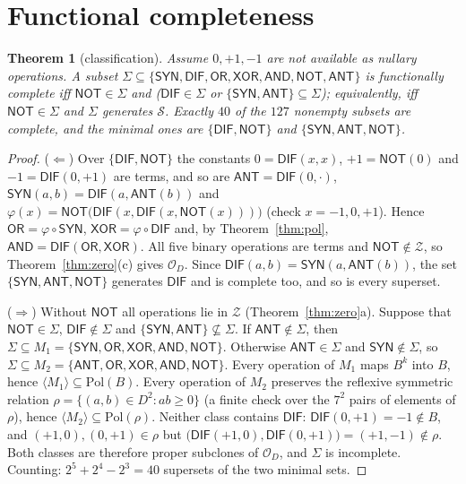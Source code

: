 \documentclass[conference]{IEEEtran}
\newcommand{\D}{D}
\newcommand{\fold}{\varphi}
\newcommand{\SYN}{\mathsf{SYN}}
\newcommand{\DIF}{\mathsf{DIF}}
\newcommand{\OR}{\mathsf{OR}}
\newcommand{\XOR}{\mathsf{XOR}}
\newcommand{\AND}{\mathsf{AND}}
\newcommand{\NOT}{\mathsf{NOT}}
\newcommand{\ANT}{\mathsf{ANT}}
\newcommand{\Z}{\mathcal Z}
\newcommand{\Odd}{\mathcal S}
\newcommand{\OD}{\mathcal{O}_{\D}}
\newtheorem{theorem}{Theorem}
\theoremstyle{remark}
\begin{document}
	\section{Functional completeness}
	\begin{theorem}[classification]\label{thm:class}
		Assume $0,+1,-1$ are not available as nullary operations. A subset $\Sigma\subseteq\{\SYN,\DIF,\OR,\XOR,\AND,\NOT,\ANT\}$ is functionally complete iff $\NOT\in\Sigma$ and ($\DIF\in\Sigma$ or $\{\SYN,\ANT\}\subseteq\Sigma$); equivalently, iff $\NOT\in\Sigma$ and $\Sigma$ generates $\Odd$. Exactly $40$ of the $127$ nonempty subsets are complete, and the minimal ones are $\{\DIF,\NOT\}$ and $\{\SYN,\ANT,\NOT\}$.
	\end{theorem}
	\begin{proof}
		($\Leftarrow$) Over $\{\DIF,\NOT\}$ the constants $0=\DIF(x,x)$, $+1=\NOT(0)$ and $-1=\DIF(0,+1)$ are terms, and so are $\ANT=\DIF(0,\cdot)$, $\SYN(a,b)=\DIF(a,\ANT(b))$ and $\fold(x)=\NOT\big(\DIF(x,\DIF(x,\NOT(x)))\big)$ (check $x=-1,0,+1$). Hence $\OR=\fold\circ\SYN$, $\XOR=\fold\circ\DIF$ and, by Theorem~\ref{thm:pol}, $\AND=\DIF(\OR,\XOR)$. All five binary operations are terms and $\NOT\notin\Z$, so Theorem~\ref{thm:zero}(c) gives $\OD$. Since $\DIF(a,b)=\SYN(a,\ANT(b))$, the set $\{\SYN,\ANT,\NOT\}$ generates $\DIF$ and is complete too, and so is every superset.
		
		($\Rightarrow$) Without $\NOT$ all operations lie in $\Z$ (Theorem~\ref{thm:zero}a). Suppose that $\NOT\in\Sigma$, $\DIF\notin\Sigma$ and $\{\SYN,\ANT\}\not\subseteq\Sigma$. If $\ANT\notin\Sigma$, then $\Sigma\subseteq M_1=\{\SYN,\OR,\XOR,\AND,\NOT\}$. Otherwise $\ANT\in\Sigma$ and $\SYN\notin\Sigma$, so $\Sigma\subseteq M_2=\{\ANT,\OR,\XOR,\AND,\NOT\}$. Every operation of $M_1$ maps $B^k$ into $B$, hence $\langle M_1\rangle\subseteq\mathrm{Pol}(B)$. Every operation of $M_2$ preserves the reflexive symmetric relation $\rho=\{(a,b)\in\D^2: ab\ge0\}$ (a finite check over the $7^2$ pairs of elements of $\rho$), hence $\langle M_2\rangle\subseteq\mathrm{Pol}(\rho)$. Neither class contains $\DIF$: $\DIF(0,+1)=-1\notin B$, and $(+1,0),(0,+1)\in\rho$ but $\big(\DIF(+1,0),\DIF(0,+1)\big)=(+1,-1)\notin\rho$. Both classes are therefore proper subclones of $\OD$, and $\Sigma$ is incomplete. Counting: $2^5+2^4-2^3=40$ supersets of the two minimal sets.
	\end{proof}
	
\end{document}

